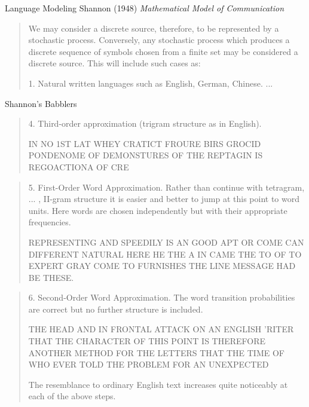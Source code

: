 \documentclass{beamer}
\begin{document}
\begin{frame}{Language Modeling}
  Shannon (1948) \textit{Mathematical Model of Communication} 

\air
  
\begin{quote}  
  We may consider a discrete source, therefore,
to be represented by a stochastic process. Conversely, any stochastic
process which produces a discrete sequence of symbols chosen from a finite
set may be considered a discrete source. This will include such cases as:

1. Natural written languages such as English, German, Chinese.
...
\end{quote}
\end{frame}

\begin{frame}[allowframebreaks]{Shannon's Babblers}

  \begin{quote}
   
  4. Third-order approximation (trigram structure as in English).

IN NO 1ST LAT WHEY CRATICT FROURE BIRS GROCID
PONDENOME OF DEMONSTURES OF THE REPTAGIN IS
REGOACTIONA OF CRE
  \end{quote}

  \begin{quote}
5. First-Order Word Approximation. Rather than continue with tetragram,
... , II-gram structure it is easier and better to jump at this
point to word units. Here words are chosen independently but with
their appropriate frequencies.

REPRESENTING AND SPEEDILY IS AN GOOD APT OR
COME CAN DIFFERENT NATURAL HERE HE THE A IN
CAME THE TO OF TO EXPERT GRAY COME TO FURNISHES
THE LINE MESSAGE HAD BE THESE.

  \end{quote}

  \begin{quote}
    6. Second-Order Word Approximation. The word transition probabilities
are correct but no further structure is included.

THE HEAD AND IN FRONTAL ATTACK ON AN ENGLISH
'RITER THAT THE CHARACTER OF THIS POINT IS
THEREFORE ANOTHER METHOD FOR THE LETTERS
THAT THE TIME OF WHO EVER TOLD THE PROBLEM
FOR AN UNEXPECTED

The resemblance to ordinary English text increases quite noticeably at
each of the above steps.

  \end{quote}
\end{frame}
\end{document}
